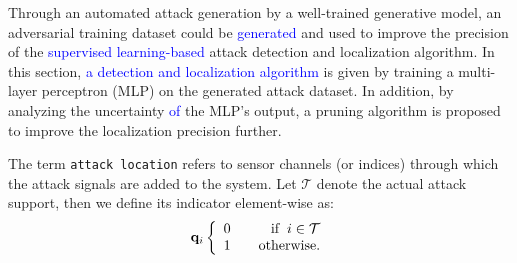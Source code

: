 Through an automated attack generation by a well-trained generative model, an adversarial training dataset could be \textcolor{blue}{generated} and used to improve the precision of the \textcolor{blue}{supervised learning-based} attack detection and localization algorithm. In this section, \textcolor{blue}{a detection and localization algorithm} is given by training a multi-layer perceptron (MLP) on the generated attack dataset. In addition, by analyzing the uncertainty \textcolor{blue}{of} the MLP's output, a pruning algorithm is proposed to improve the localization precision further.

The term \texttt{attack location} refers to sensor channels (or indices) through which the attack signals are added to the system. Let $\mathcal{T}$ denote the actual attack support, then we define its indicator element-wise as:
 \begin{equation} \label{equ:support}
     \mathbf{q}_i\left\{
     \begin{array}{lr}
     0 &\quad\text{if}\hspace{0.2cm} i \in \mathcal{T} \\
     1 &\quad\text{otherwise}.
     \end{array}
     \right.
 \end{equation}
 
